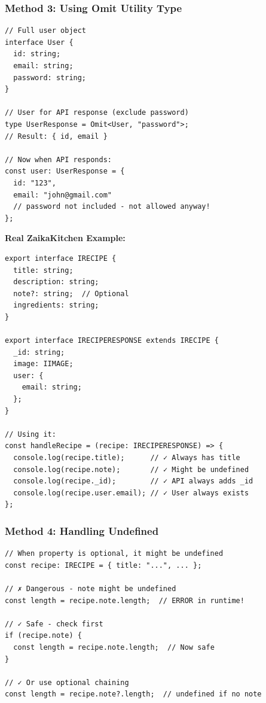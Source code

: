 \documentclass[12pt]{article}
\begin{document}
\subsubsection*{Method 3: Using Omit Utility Type}

\begin{lstlisting}
// Full user object
interface User {
  id: string;
  email: string;
  password: string;
}

// User for API response (exclude password)
type UserResponse = Omit<User, "password">;
// Result: { id, email }

// Now when API responds:
const user: UserResponse = {
  id: "123",
  email: "john@gmail.com"
  // password not included - not allowed anyway!
};
\end{lstlisting}

\textbf{Real ZaikaKitchen Example:}

\begin{lstlisting}
export interface IRECIPE {
  title: string;
  description: string;
  note?: string;  // Optional
  ingredients: string;
}

export interface IRECIPERESPONSE extends IRECIPE {
  _id: string;
  image: IIMAGE;
  user: {
    email: string;
  };
}

// Using it:
const handleRecipe = (recipe: IRECIPERESPONSE) => {
  console.log(recipe.title);      // ✓ Always has title
  console.log(recipe.note);       // ✓ Might be undefined
  console.log(recipe._id);        // ✓ API always adds _id
  console.log(recipe.user.email); // ✓ User always exists
};
\end{lstlisting}

\subsubsection*{Method 4: Handling Undefined}

\begin{lstlisting}
// When property is optional, it might be undefined
const recipe: IRECIPE = { title: "...", ... };

// ✗ Dangerous - note might be undefined
const length = recipe.note.length;  // ERROR in runtime!

// ✓ Safe - check first
if (recipe.note) {
  const length = recipe.note.length;  // Now safe
}

// ✓ Or use optional chaining
const length = recipe.note?.length;  // undefined if no note
\end{lstlisting}
\end{document}

